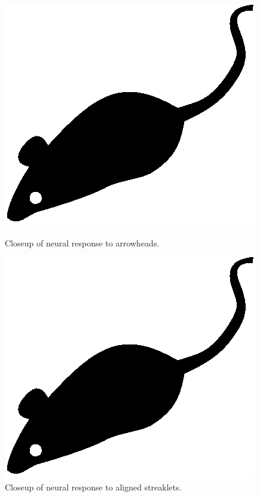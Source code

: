 \begin{figure}[tp]
    \begin{minipage}[t]{0.45\linewidth}
        \centering
        \includegraphics{./fig/acmlarge-mouse}
        \caption{Closeup of neural response to arrowheads.}
        \label{ortharrowheadfig}
    \end{minipage}
    \hspace{0.1\linewidth}
    \begin{minipage}[t]{0.45\linewidth}
        \centering
        \includegraphics{./fig/acmlarge-mouse}
        \caption{Closeup of neural response to aligned streaklets.}
        \label{alignedcloseupfig}
    \end{minipage}
\end{figure}


